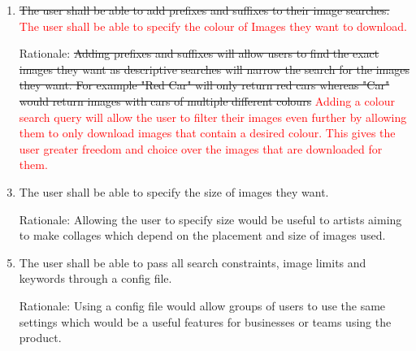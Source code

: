 \documentclass[12pt, titlepage]{article}
\begin{document}
\begin{enumerate}[label=FR\arabic*:, wide=0pt, leftmargin=*]
    \\
    \item \st{The user shall be able to add prefixes and suffixes to their image searches.} \textcolor{red}{The user shall be able to specify the colour of Images they want to download.}
    \item[Rationale:] \st{Adding prefixes and suffixes will allow users to find the exact images they want as descriptive searches will narrow the search for the images they want. For example "Red Car" will only return red cars whereas "Car" would return images with cars of multiple different colours} \textcolor{red}{Adding a colour search query will allow the user to filter their images even further by allowing them to only download images that contain a desired colour. This gives the user greater freedom and choice over the images that are downloaded for them.}
    \\
    \item The user shall be able to specify the size of images they want.
    \item[Rationale:] Allowing the user to specify size would be useful to artists aiming to make collages which depend on the placement and size of images used.
    \\
    \item The user shall be able to pass all search constraints, image limits and keywords through a config file.
    \item[Rationale:] Using a config file would allow groups of users to use the same settings which would be a useful features for businesses or teams using the product.
\\
\color{red}


\end{enumerate}
\end{document}
